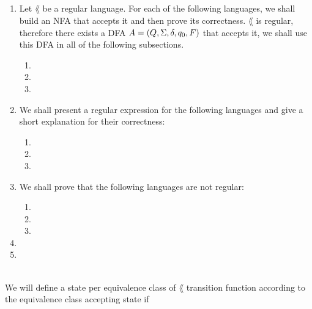 \documentclass{article}
\title{
    \textmd{\bd{\hmwkClass:\ \hmwkTitle}}\\
}
\author{\hmwkAuthorName}
\begin{document}
\maketitle

\begin{enumerate}
      \item Let \(\lang\)  be a regular language. For each of the following languages,
            we shall build an NFA that accepts it and then prove its correctness.
            \(\lang\) is regular, therefore there exists a DFA \(A=(Q, \Sigma, \delta, q_0, F)\)
            that accepts it, we shall use this DFA in all of the following subsections.

            \begin{enumerate}
                  \item 
                  \item 
                  \item 
            \end{enumerate}

            \pagebreak

      \item We shall present a regular expression for the following languages and give a short
            explanation for their correctness:

            \begin{enumerate}
                  \item 
                  \item 
                  \item 
            \end{enumerate}

            \pagebreak

      \item We shall prove that the following languages are not regular:
            \begin{enumerate}
                  \item 
                  \item 
                  \item 
            \end{enumerate}

            \pagebreak

      \item 

      \item 


\end{enumerate}

 \\
We will define a state per equivalence class of $\lang$
transition function according to the equivalence class
accepting state if
\end{document}
